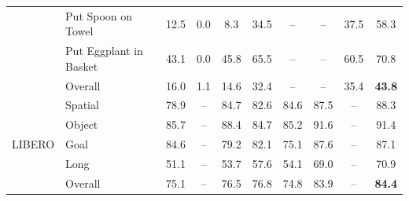 \begin{table}[t]
{\begin{tabular}{ll|cccccccc}
              & Put Spoon on Towel     & 12.5 & 0.0 & 8.3 & 34.5 & -- & -- & 37.5 & 58.3 \\
              & Put Eggplant in Basket & 43.1 & 0.0 & 45.8 & 65.5 & -- & -- & 60.5 & 70.8 \\
              \rowcolor{gray!20}
              & Overall               & 16.0 & 1.1 & 14.6 & 32.4 & -- & -- & {35.4} & \textbf{43.8} \\
            \midrule
            \multirow{5}{*}{LIBERO}
              & Spatial & 78.9 & -- & 84.7 & 82.6 & 84.6 & 87.5 & -- & 88.3 \\
              & Object  & 85.7 & -- & 88.4 & 84.7 & 85.2 & 91.6 & -- & 91.4 \\
              & Goal    & 84.6 & -- & 79.2 & 82.1 & 75.1 & 87.6 & -- & 87.1 \\
              & Long    & 51.1 & -- & 53.7 & 57.6 & 54.1 & 69.0 & -- & 70.9 \\
              \rowcolor{gray!20}
              & Overall & 75.1 & -- & 76.5 & 76.8 & 74.8 & {83.9} & -- & \textbf{84.4} \\
            \bottomrule
        \end{tabular}
    }
\end{table}